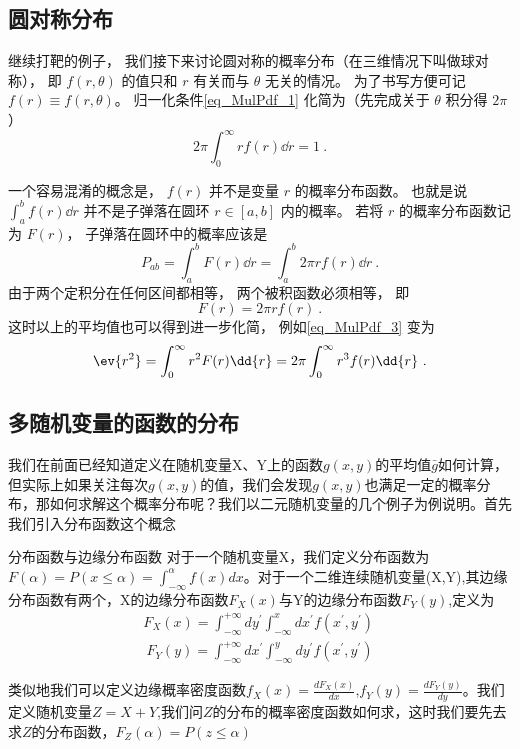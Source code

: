 
\subsection{圆对称分布}
继续打靶的例子， 我们接下来讨论圆对称的概率分布（在三维情况下叫做球对称）， 即 $f(r, \theta)$ 的值只和 $r$ 有关而与 $\theta$ 无关的情况。 为了书写方便可记 $f(r) \equiv f(r, \theta)$。 归一化条件\autoref{eq_MulPdf_1} 化简为（先完成关于 $\theta$ 积分得 $2\pi$）
\begin{equation}
2\pi \int_0^\infty r f(r) \dd{r} = 1~.
\end{equation}

一个容易混淆的概念是， $f(r)$ 并不是变量 $r$ 的概率分布函数。 也就是说 $\int_a^b f(r) \dd{r}$ 并不是子弹落在圆环 $r \in [a, b]$ 内的概率。 若将 $r$ 的概率分布函数记为 $F(r)$， 子弹落在圆环中的概率应该是
\begin{equation}\label{eq_MulPdf_4}
P_{ab} = \int_a^b F(r) \dd{r} = \int_a^b 2\pi r f(r) \dd{r}~.
\end{equation}
由于两个定积分在任何区间都相等， 两个被积函数必须相等， 即
\begin{equation}\label{eq_MulPdf_5}
F(r) = 2\pi r f(r)~.
\end{equation}
这时以上的平均值也可以得到进一步化简， 例如\autoref{eq_MulPdf_3} 变为
\begin{equation}
\ev{r^2} = \int_0^\infty r^2 F(r) \dd{r}
= 2\pi \int_0^\infty r^3 f(r) \dd{r}~.
\end{equation}
\subsection{多随机变量的函数的分布}
我们在前面已经知道定义在随机变量X、Y上的函数$g(x,y)$的平均值$\bar{g}$如何计算，但实际上如果关注每次$g(x,y)$的值，我们会发现$g(x,y)$也满足一定的概率分布，那如何求解这个概率分布呢？我们以二元随机变量的几个例子为例说明。首先我们引入分布函数这个概念
\begin{definition}{分布函数与边缘分布函数}
对于一个随机变量X，我们定义分布函数为$F(\alpha)=P(x\leq \alpha) = \int_{-\infty}^{\alpha} f(x)dx$。对于一个二维连续随机变量(X,Y),其边缘分布函数有两个，X的边缘分布函数$F_X(x)$与Y的边缘分布函数$F_Y(y)$,定义为
\begin{align}
F_X(x) = \int_{-\infty}^{+\infty} dy^\prime \int_{-\infty}^{x} dx^\prime f(x^\prime,y^\prime)\\~
F_Y(y) = \int_{-\infty}^{+\infty} dx^\prime \int_{-\infty}^y dy^\prime f(x^\prime,y^\prime)~
\end{align}
\end{definition}
类似地我们可以定义边缘概率密度函数$f_X(x) = \frac{dF_X(x)}{dx}$,$f_Y(y) = \frac{dF_Y(y)}{dy}$。我们定义随机变量$Z=X+Y$,我们问$Z$的分布的概率密度函数如何求，这时我们要先去求$Z$的分布函数，$F_Z(\alpha)=P(z\leq \alpha)$

